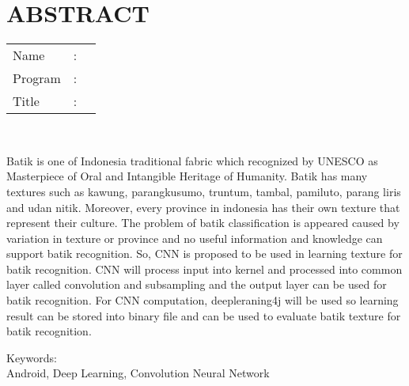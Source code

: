 %
%
%

\chapter*{ABSTRACT}

\vspace*{0.2cm}

\noindent \begin{tabular}{l l p{11.0cm}}
	Name&: & \penulis \\
	Program&: & \program \\
	Title&: & \judulInggris \\
\end{tabular} \\ 

\vspace*{0.5cm}

\noindent Batik is one of Indonesia traditional fabric which recognized by UNESCO as Masterpiece of Oral and Intangible Heritage of Humanity. Batik has many textures such as kawung, parangkusumo, truntum, tambal, pamiluto, parang liris and udan nitik. Moreover, every province in indonesia has their own texture that represent their culture. The problem of batik classification is appeared caused by variation in texture or province and no useful information and knowledge can support batik recognition. So, CNN is proposed to be used in learning texture for batik recognition. CNN will process input into kernel and processed into common layer called convolution and subsampling and the output layer can be used for batik recognition. For CNN computation, deepleraning4j will be used so learning result can be stored into binary file and can be used to evaluate batik texture for batik recognition.\\

\vspace*{0.2cm}

\noindent Keywords: \\ 
\noindent Android, Deep Learning, Convolution Neural Network
\newpage